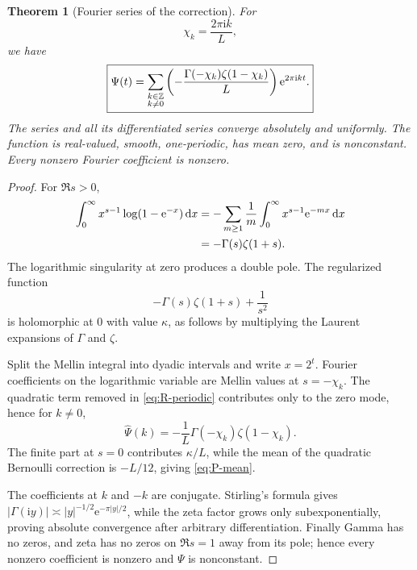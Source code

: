 \documentclass[11pt]{article}
\newtheorem{theorem}{Theorem}[section]
\theoremstyle{definition}
\theoremstyle{remark}
\newcommand{\dd}{\,\mathrm d}\newcommand{\e}{\mathrm e}\newcommand{\ii}{\mathrm i}
\begin{document}
\begin{theorem}[Fourier series of the correction]\label{thm:Psi}
For
\begin{equation}\label{eq:chi}
 \chi_k=\frac{2\pi\ii k}{L},
\end{equation}
we have
\begin{equation}\label{eq:Psi}
\boxed{
 \Psi(t)=\sum_{\substack{k\in\Z\\k\ne0}}
 \left(-\frac{\Gamma(-\chi_k)\zeta(1-\chi_k)}{L}\right)
 \e^{2\pi\ii kt}.}
\end{equation}
The series and all its differentiated series converge absolutely and uniformly.  The function is real-valued, smooth, one-periodic, has mean zero, and is nonconstant.  Every nonzero Fourier coefficient is nonzero.
\end{theorem}
\begin{proof}
For $\Re s>0$,
\begin{align}
 \int_0^\infty x^{s-1}\log(1-\e^{-x})\dd x
 &=-\sum_{m\ge1}\frac1m\int_0^\infty x^{s-1}\e^{-mx}\dd x\notag\\
 &=-\Gamma(s)\zeta(1+s).\label{eq:Bose-Mellin}
\end{align}
The logarithmic singularity at zero produces a double pole.  The regularized function
\begin{equation}\label{eq:regularized-Mellin}
 -\Gamma(s)\zeta(1+s)+\frac1{s^2}
\end{equation}
is holomorphic at $0$ with value $\kappa$, as follows by multiplying the Laurent expansions of $\Gamma$ and $\zeta$.

Split the Mellin integral into dyadic intervals and write $x=2^t$.  Fourier coefficients on the logarithmic variable are Mellin values at $s=-\chi_k$.  The quadratic term removed in \eqref{eq:R-periodic} contributes only to the zero mode, hence for $k\ne0$,
\[
 \widehat\Psi(k)=-\frac1L\Gamma(-\chi_k)\zeta(1-\chi_k).
\]
The finite part at $s=0$ contributes $\kappa/L$, while the mean of the quadratic Bernoulli correction is $-L/12$, giving \eqref{eq:P-mean}.

The coefficients at $k$ and $-k$ are conjugate.  Stirling's formula gives
$|\Gamma(\ii y)|\asymp |y|^{-1/2}\e^{-\pi|y|/2}$, while the zeta factor grows only subexponentially, proving absolute convergence after arbitrary differentiation.  Finally Gamma has no zeros, and zeta has no zeros on $\Re s=1$ away from its pole; hence every nonzero coefficient is nonzero and $\Psi$ is nonconstant.
\end{proof}
\end{document}
